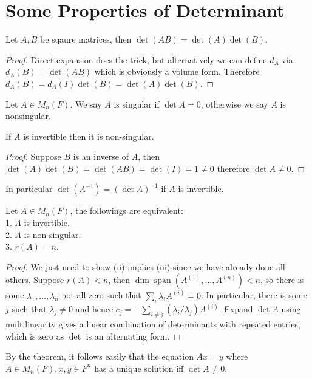 \section{Some Properties of Determinant}
\begin{lemma}
    Let $A,B$ be sqaure matrices, then $\det(AB)=\det(A)\det(B)$.
\end{lemma}
\begin{proof}
    Direct expansion does the trick, but alternatively we can define $d_A$ via $d_A(B)=\det(AB)$ which is obviously a volume form.
    Therefore $d_A(B)=d_A(I)\det(B)=\det(A)\det(B)$.
\end{proof}
\begin{definition}
    Let $A\in M_n(F)$.
    We say $A$ is singular if $\det A=0$, otherwise we say $A$ is nonsingular.
\end{definition}
\begin{lemma}
    If $A$ is invertible then it is non-singular.
\end{lemma}
\begin{proof}
    Suppose $B$ is an inverse of $A$, then $\det(A)\det(B)=\det(AB)=\det(I)=1\neq 0$ therefore $\det A\neq 0$.
\end{proof}
\begin{remark}
    In particular $\det(A^{-1})=(\det A)^{-1}$ if $A$ is invertible.
\end{remark}
\begin{theorem}
    Let $A\in M_n(F)$, the followings are equivalent:\\
    1. $A$ is invertible.\\
    2. $A$ is non-singular.\\
    3. $r(A)=n$.
\end{theorem}
\begin{proof}
    We just need to show (ii) implies (iii) since we have already done all others.
    Suppose $r(A)<n$, then $\dim\operatorname{span}(A^{(1)},\ldots, A^{(n)})<n$, so there is some $\lambda_1,\ldots,\lambda_n$ not all zero such that $\sum_i\lambda_iA^{(i)}=0$.
    In particular, there is some $j$ such that $\lambda_j\neq 0$ and hence $c_j=-\sum_{i\neq j}(\lambda_i/\lambda_j)A^{(i)}$.
    Expand $\det A$ using multilinearity gives a linear combination of determinants with repeated entries, which is zero as $\det$ is an alternating form.
\end{proof}
\begin{remark}
    By the theorem, it follows easily that the equation $Ax=y$ where $A\in M_n(F),x,y\in F^n$ has a unique solution iff $\det A\neq 0$.
\end{remark}

